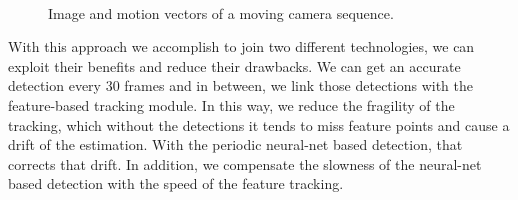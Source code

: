 \begin{figure}[H]
		
\centering

\\
\caption{Image and motion vectors of a moving camera sequence.}
\label{systemintro2}
\end{figure}




With this approach we accomplish to join two different technologies, we can exploit their benefits and reduce their drawbacks. We can get an accurate detection every $30$ frames and in between, we link those detections with the feature-based tracking module. In this way, we reduce the fragility of the tracking, which without the detections it tends to miss feature points and cause a drift of the estimation. With the periodic neural-net based detection, that corrects that drift. In addition, we compensate the slowness of the neural-net based detection with the speed of the feature tracking.



